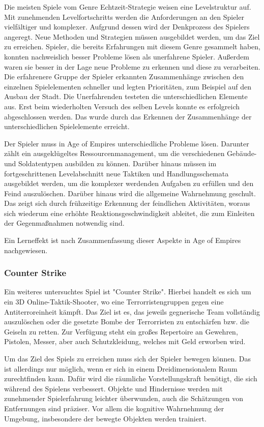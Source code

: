 Die meisten Spiele vom Genre Echtzeit-Strategie weisen eine Levelstruktur auf. Mit zunehmenden Levelfortschritts werden die Anforderungen an den Spieler vielfältiger und komplexer. Aufgrund dessen wird der Denkprozess des Spielers angeregt. Neue Methoden und Strategien müssen ausgebildet werden, um das Ziel zu erreichen. Spieler, die bereits Erfahrungen mit diesem Genre gesammelt haben, konnten nachweislich besser Probleme lösen als unerfahrene Spieler. Außerdem waren sie besser in der Lage neue Probleme zu erkennen und diese zu verarbeiten. Die erfahrenere Gruppe der Spieler erkannten Zusammenhänge zwischen den einzelnen Spielelementen schneller und legten Prioritäten, zum Beispiel auf den Ausbau der Stadt. Die Unerfahrenden testeten die unterschiedlichen Elemente aus. Erst beim wiederholten Versuch des selben Levels konnte es erfolgreich abgeschlossen werden. Das wurde durch das Erkennen der Zusammenhänge der unterschiedlichen Spielelemente erreicht.

Der Spieler muss in Age of Empires unterschiedliche Probleme lösen. Darunter zählt ein ausgeklügeltes Ressourcenmanagement, um die verschiedenen Gebäude- und Soldatentypen ausbilden zu können. Darüber hinaus müssen im fortgeschrittenen Levelabschnitt neue Taktiken und Handlungsschemata ausgebildet werden, um die komplexer werdenden Aufgaben zu erfüllen und den Feind auszulöschen. Darüber hinaus wird die allgemeine Wahrnehmung geschult. Das zeigt sich durch frühzeitige Erkennung der feindlichen Aktivitäten, woraus sich wiederum eine erhöhte Reaktionsgeschwindigkeit ableitet, die zum Einleiten der Gegenmaßnahmen notwendig sind. 

Ein Lerneffekt ist nach Zusammenfassung dieser Aspekte in Age of Empires nachgewiesen.

\subsubsection{Counter Strike}
Ein weiteres untersuchtes Spiel ist "{}Counter Strike"{}. Hierbei handelt es sich um ein 3D Online-Taktik-Shooter, wo eine Terrorristengruppen gegen eine Antiterroreinheit kämpft. Das Ziel ist es, das jeweils gegnerische Team vollständig auszulöschen oder die gesetzte Bombe der Terrorristen zu entschärfen bzw. die Geiseln zu retten. Zur Verfügung steht ein großes Repertoire an Gewehren, Pistolen, Messer, aber auch Schutzkleidung, welches mit Geld erworben wird.

Um das Ziel des Spiels zu erreichen muss sich der Spieler bewegen können. Das ist allerdings nur möglich, wenn er sich in einem Dreidimensionalem Raum zurechtfinden kann. Dafür wird die räumliche Vorstellungskraft benötigt, die sich während des Spielens verbessert.\cite{christianstoecker2004} Objekte und Hindernisse werden mit zunehmender Spielerfahrung leichter überwunden, auch die Schätzungen von Entfernungen sind präziser. Vor allem die kognitive Wahrnehmung der Umgebung, insbesondere der bewegte Objekten werden trainiert.\cite{frankstoewer2003} 

